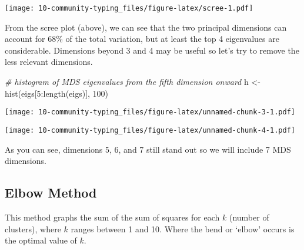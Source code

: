 \documentclass[
  oneside]{book}
\newenvironment{Shaded}{\begin{snugshade}}{\end{snugshade}}
\newcommand{\AttributeTok}[1]{\textcolor[rgb]{0.77,0.63,0.00}{#1}}
\newcommand{\CommentTok}[1]{\textcolor[rgb]{0.56,0.35,0.01}{\textit{#1}}}
\newcommand{\DecValTok}[1]{\textcolor[rgb]{0.00,0.00,0.81}{#1}}
\newcommand{\FunctionTok}[1]{\textcolor[rgb]{0.00,0.00,0.00}{#1}}
\newcommand{\NormalTok}[1]{#1}
\newcommand{\OtherTok}[1]{\textcolor[rgb]{0.56,0.35,0.01}{#1}}
\newcommand{\SpecialCharTok}[1]{\textcolor[rgb]{0.00,0.00,0.00}{#1}}
\newcommand{\StringTok}[1]{\textcolor[rgb]{0.31,0.60,0.02}{#1}}
\begin{document}
\texttt{[image: 10-community-typing\_files/figure-latex/scree-1.pdf]}

From the scree plot (above), we can see that the two principal dimensions can account for 68\% of the total variation, but at least the top 4 eigenvalues are considerable. Dimensions beyond 3 and 4 may be useful so let's try to remove the less relevant dimensions.

\begin{Shaded}
\begin{Highlighting}[]
\CommentTok{\# histogram of MDS eigenvalues from the fifth dimension onward}
\NormalTok{h }\OtherTok{\textless{}{-}} \FunctionTok{hist}\NormalTok{(eigs[}\DecValTok{5}\SpecialCharTok{:}\FunctionTok{length}\NormalTok{(eigs)], }\DecValTok{100}\NormalTok{)}
\end{Highlighting}
\end{Shaded}

\texttt{[image: 10-community-typing\_files/figure-latex/unnamed-chunk-3-1.pdf]}

\begin{Shaded}
\end{Shaded}

\texttt{[image: 10-community-typing\_files/figure-latex/unnamed-chunk-4-1.pdf]}

As you can see, dimensions 5, 6, and 7 still stand out so we will include 7 MDS dimensions.

\hypertarget{elbow-method}{%
\subsection{Elbow Method}\label{elbow-method}}

This method graphs the sum of the sum of squares for each \(k\) (number of clusters), where \(k\) ranges between 1 and 10. Where the bend or `elbow' occurs is the optimal value of \(k\).
\end{document}
